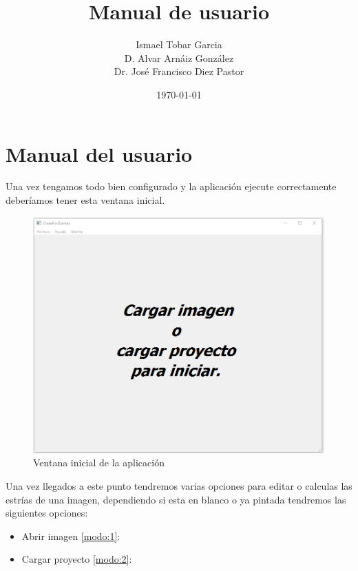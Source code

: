 \documentclass[13pt]{book}              %
\title{\bf Manual de usuario}    %
\author{
  Ismael Tobar Garcia     
  \\[3ex]
  D. Alvar Arnáiz González
  \\[3ex]
  Dr. José Francisco Diez Pastor
  \\[3ex]
}
\date{\today}
\begin{document}
                       
\maketitle         
\cleardoublepage                   
\tableofcontents                       
\newpage



\section{Manual del usuario}
{ \huge

Una vez tengamos todo bien configurado y la aplicación ejecute correctamente deberíamos tener esta ventana inicial.

\begin{figure}[h]
\centering
\includegraphics[width=.99\textwidth]{VentanaInicial}
\caption{Ventana inicial de la aplicación}
\label{fig:E.1}
\end{figure}
Una vez llegados a este punto tendremos varias opciones para editar o calculas las estrías de una imagen, dependiendo si esta en blanco o ya pintada tendremos las siguientes opciones:

\begin{itemize}
	\item Abrir imagen \ref{modo:1}:

	\item Cargar proyecto \ref{modo:2}:
	
\end{itemize}


}
\end{document}
